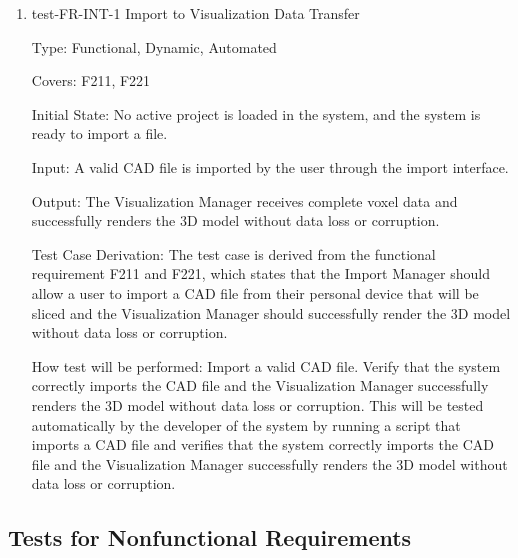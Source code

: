 \documentclass[12pt, titlepage]{article}
\begin{document}
\begin{enumerate}

\item{test-FR-INT-1 Import to Visualization Data Transfer\\}

Type: Functional, Dynamic, Automated

Covers: F211, F221
					
Initial State: No active project is loaded in the system, and the system is ready to import a file.
					
Input: A valid CAD file is imported by the user through the import interface.
					
Output: The Visualization Manager receives complete voxel data and successfully renders the 3D model without data loss or corruption.

Test Case Derivation: The test case is derived from the functional requirement F211 and F221, which states that the Import Manager should allow a user to import a CAD file from their personal device that will be sliced and the Visualization Manager should successfully render the 3D model without data loss or corruption.
					
How test will be performed: Import a valid CAD file. Verify that the system correctly imports the CAD file and the Visualization Manager successfully renders the 3D model without data loss or corruption. This will be tested automatically by the developer of the system by running a script that imports a CAD file and verifies that the system correctly imports the CAD file and the Visualization Manager successfully renders the 3D model without data loss or corruption.


\end{enumerate}

\subsection{Tests for Nonfunctional Requirements}


\end{document}
